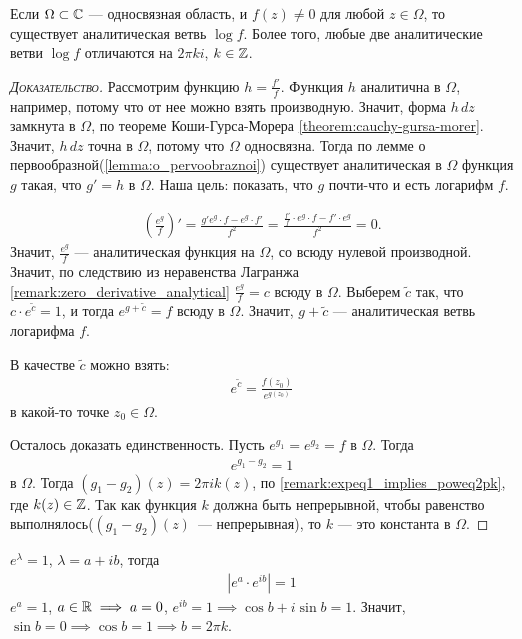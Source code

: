 \documentclass[../complex-analysis.tex]{subfiles}
\begin{document}
\begin{thm}[%
]
 Если $ \Omega \subset \mathbb{C} $ --- односвязная область, и $ f(z) \neq 0 $ для любой $ z \in \Omega $, то существует аналитическая ветвь $ \log f $. Более того, любые две аналитические ветви $ \log f $ отличаются на $ 2\pi k i $, $ k \in \mathbb{Z} $.
\end{thm}
\begin{proof}[\normalfont\textsc{Доказательство}]
    Рассмотрим функцию $h = \frac{f'}{f}$. Функция $ h $ аналитична в $ \Omega $, например, потому что от нее можно взять производную. Значит, форма  $ h\,dz $ замкнута в  $ \Omega $, по теореме Коши-Гурса-Морера \eqref{theorem:cauchy-gursa-morer}. Значит, $ h\,dz $ точна в  $ \Omega $, потому что  $ \Omega $  односвязна. Тогда по лемме о первообразной(\ref{lemma:o_pervoobraznoi}) существует аналитическая в $ \Omega $  функция $ g $  такая, что $ g' = h $ в  $ \Omega $. Наша цель: показать, что $ g $  почти-что и есть логарифм $ f $.

 \begin{align*}
  \left( \frac{e^{g}}{f} \right)' = \frac{g' e^{g} \cdot f - e^{g} \cdot f'}{f^{2}} = \frac{\frac{f'}{f} \cdot e^{g} \cdot f - f' \cdot e^{g}}{f^{2}} = 0.
\end{align*} Значит, $ \frac{e^{g}}{f} $  --- аналитическая функция на $ \Omega $, со всюду нулевой производной. Значит, по следствию из неравенства Лагранжа \eqref{remark:zero_derivative_analytical} $ \frac{e^{g}}{f} = c $ всюду в $ \Omega $. Выберем $ \tilde c $ так, что $ c \cdot e^{\tilde c} = 1 $, и тогда $ e^{g+\tilde c} = f $ всюду в $ \Omega $. Значит, $ g + \tilde c $ --- аналитическая ветвь логарифма $ f $.

В качестве $\tilde c$ можно взять: 
 \begin{align*}
  e^{\tilde c} = \frac{ f(z_0)}{e^{g(z_0)}}
 \end{align*} в какой-то точке $ z_0 \in \Omega $.

 Осталось доказать единственность. Пусть $ e^{g_1} = e^{g_2} = f $ в $ \Omega $. Тогда
 \begin{align*}
  e^{g_1 - g_2} = 1
\end{align*} в $ \Omega $. Тогда $ (g_1-g_2)(z) = 2\pi i k (z) $, по \eqref{remark:expeq1_implies_poweq2pk}, где $ k(z) \in \mathbb{Z}$. Так как функция $k$ должна быть 
непрерывной, чтобы равенство выполнялось($(g_1 - g_2)(z)$~--- непрерывная), то $ k $ --- это константа в $ \Omega $.

\end{proof}
\begin{remrk}
  \label{remark:expeq1_implies_poweq2pk}
 $ e^{\lambda} = 1 $, $ \lambda = a + ib $, тогда
 \begin{align*}
  \left|e^{a} \cdot e^{ib} \right| = 1
 \end{align*} $ e^{a} = 1 $, $ a \in \mathbb{R} \implies a = 0 $, $ e^{ib} = 1 \implies \cos b + i \sin b = 1$. Значит, $ \sin b = 0 \implies \cos b = 1 \implies b = 2\pi k $.
\end{remrk}
\end{document}
